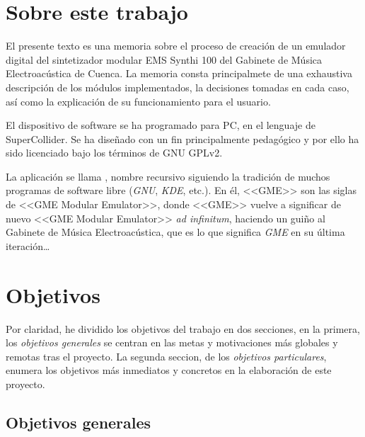 \section{Sobre este trabajo}

El presente texto es una memoria sobre el proceso de creación de un emulador digital del sintetizador modular EMS Synthi 100 del Gabinete de Música Electroacústica de Cuenca. La memoria consta principalmete de una exhaustiva descripción de los módulos implementados, la decisiones tomadas en cada caso, así como la explicación de su funcionamiento para el usuario.

El dispositivo de software se ha programado para PC, en el lenguaje de SuperCollider. Se ha diseñado con un fin principalmente pedagógico y por ello ha sido licenciado bajo los términos de GNU GPLv2. 

La aplicación se llama \appName, nombre recursivo siguiendo la tradición de muchos programas de software libre (\textit{GNU}, \textit{KDE}, etc.). En él, <<GME>> son las siglas de <<GME Modular Emulator>>, donde <<GME>> vuelve a significar de nuevo <<GME Modular Emulator>> \textit{ad infinitum}, haciendo un guiño al Gabinete de Música Electroacústica, que es lo que significa \textit{GME} en su última iteración\dots


\section{Objetivos}
\label{sec:objetivos}

Por claridad, he dividido los objetivos del trabajo en dos secciones, en la primera, los \textit{objetivos generales} se centran en las metas y motivaciones más globales y remotas tras el proyecto. La segunda seccion, de los \textit{objetivos particulares}, enumera los objetivos más inmediatos y concretos en la elaboración de este proyecto.


\subsection{Objetivos generales}


